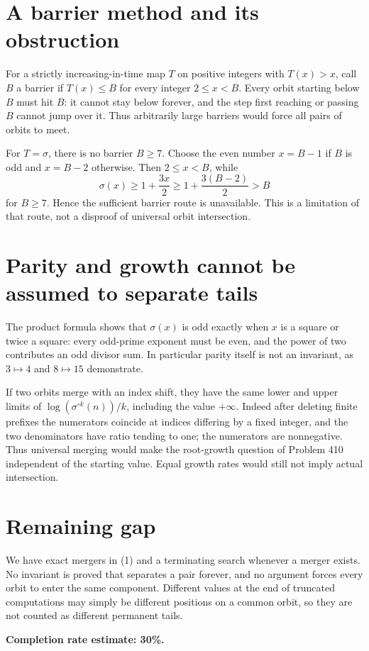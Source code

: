 \documentclass[11pt]{article}
\begin{document}
\section*{A barrier method and its obstruction}
For a strictly increasing-in-time map $T$ on positive integers with $T(x)>x$, call $B$ a barrier if $T(x)\le B$ for every integer $2\le x<B$. Every orbit starting below $B$ must hit $B$: it cannot stay below forever, and the step first reaching or passing $B$ cannot jump over it. Thus arbitrarily large barriers would force all pairs of orbits to meet.

For $T=\sigma$, there is no barrier $B\ge7$. Choose the even number $x=B-1$ if $B$ is odd and $x=B-2$ otherwise. Then $2\le x<B$, while
\[
 \sigma(x)\ge1+\frac{3x}{2}\ge1+\frac{3(B-2)}2>B
\]
for $B\ge7$. Hence the sufficient barrier route is unavailable. This is a limitation of that route, not a disproof of universal orbit intersection.

\section*{Parity and growth cannot be assumed to separate tails}
The product formula shows that $\sigma(x)$ is odd exactly when $x$ is a square or twice a square: every odd-prime exponent must be even, and the power of two contributes an odd divisor sum. In particular parity itself is not an invariant, as $3\mapsto4$ and $8\mapsto15$ demonstrate.

If two orbits merge with an index shift, they have the same lower and upper limits of $\log(\sigma^{\circ k}(n))/k$, including the value $+\infty$. Indeed after deleting finite prefixes the numerators coincide at indices differing by a fixed integer, and the two denominators have ratio tending to one; the numerators are nonnegative. Thus universal merging would make the root-growth question of Problem 410 independent of the starting value. Equal growth rates would still not imply actual intersection.

\section*{Remaining gap}
We have exact mergers in (1) and a terminating search whenever a merger exists. No invariant is proved that separates a pair forever, and no argument forces every orbit to enter the same component. Different values at the end of truncated computations may simply be different positions on a common orbit, so they are not counted as different permanent tails.

\textbf{Completion rate estimate: 30\%.}
\end{document}
